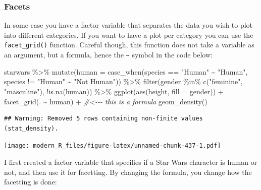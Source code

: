 \documentclass[
]{article}
\newenvironment{Shaded}{\begin{snugshade}}{\end{snugshade}}
\newcommand{\AttributeTok}[1]{\textcolor[rgb]{0.77,0.63,0.00}{#1}}
\newcommand{\CommentTok}[1]{\textcolor[rgb]{0.56,0.35,0.01}{\textit{#1}}}
\newcommand{\FunctionTok}[1]{\textcolor[rgb]{0.00,0.00,0.00}{#1}}
\newcommand{\NormalTok}[1]{#1}
\newcommand{\SpecialCharTok}[1]{\textcolor[rgb]{0.00,0.00,0.00}{#1}}
\newcommand{\StringTok}[1]{\textcolor[rgb]{0.31,0.60,0.02}{#1}}
\begin{document}
\hypertarget{facets}{%
\subsubsection{Facets}\label{facets}}

In some case you have a factor variable that separates the data you wish to plot into different
categories. If you want to have a plot per category you can use the \texttt{facet\_grid()} function.
Careful though, this function does not take a variable as an argument, but a formula, hence the \texttt{\textasciitilde{}}
symbol in the code below:

\begin{Shaded}
\begin{Highlighting}[]
\NormalTok{starwars }\SpecialCharTok{\%\textgreater{}\%}
  \FunctionTok{mutate}\NormalTok{(}\AttributeTok{human =} \FunctionTok{case\_when}\NormalTok{(species }\SpecialCharTok{==} \StringTok{"Human"} \SpecialCharTok{\textasciitilde{}} \StringTok{"Human"}\NormalTok{,}
\NormalTok{                           species }\SpecialCharTok{!=} \StringTok{"Human"} \SpecialCharTok{\textasciitilde{}} \StringTok{"Not Human"}\NormalTok{)) }\SpecialCharTok{\%\textgreater{}\%}
  \FunctionTok{filter}\NormalTok{(gender }\SpecialCharTok{\%in\%} \FunctionTok{c}\NormalTok{(}\StringTok{"feminine"}\NormalTok{, }\StringTok{"masculine"}\NormalTok{), }\SpecialCharTok{!}\FunctionTok{is.na}\NormalTok{(human)) }\SpecialCharTok{\%\textgreater{}\%}
  \FunctionTok{ggplot}\NormalTok{(}\FunctionTok{aes}\NormalTok{(height, }\AttributeTok{fill =}\NormalTok{ gender)) }\SpecialCharTok{+}
  \FunctionTok{facet\_grid}\NormalTok{(. }\SpecialCharTok{\textasciitilde{}}\NormalTok{ human) }\SpecialCharTok{+} \CommentTok{\#\textless{}{-}{-}{-} this is a formula}
  \FunctionTok{geom\_density}\NormalTok{()}
\end{Highlighting}
\end{Shaded}

\begin{verbatim}
## Warning: Removed 5 rows containing non-finite values (stat_density).
\end{verbatim}

\texttt{[image: modern\_R\_files/figure-latex/unnamed-chunk-437-1.pdf]}

I first created a factor variable that specifies if a Star Wars character is human or not, and then
use it for facetting. By changing the formula, you change how the facetting is done:
\end{document}
